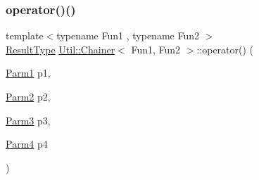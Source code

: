 \mbox{\label{classUtil_1_1Chainer_aebe5bd1cb7c2523124ccdf2b406ff7d1}} 
\subsubsection{\texorpdfstring{operator()()}{operator()()}\hspace{0.1cm}{\footnotesize\ttfamily [14/18]}}
{\footnotesize\ttfamily template$<$typename Fun1 , typename Fun2 $>$ \\
\mbox{\hyperlink{classUtil_1_1Chainer_a2c8d88a77b8ba93eb915dc799ddafbb9}{Result\+Type}} \mbox{\hyperlink{classUtil_1_1Chainer}{Util\+::\+Chainer}}$<$ Fun1, Fun2 $>$\+::operator() (\begin{DoxyParamCaption}\item[{\mbox{\hyperlink{classUtil_1_1Chainer_a3e09b2267dabdd8d12070b09c47749c6}{Parm1}}}]{p1,  }\item[{\mbox{\hyperlink{classUtil_1_1Chainer_a1bfb0e8f35679278c85d232a74a107ff}{Parm2}}}]{p2,  }\item[{\mbox{\hyperlink{classUtil_1_1Chainer_ac28811d7153f7b7cf837f7b8626436c8}{Parm3}}}]{p3,  }\item[{\mbox{\hyperlink{classUtil_1_1Chainer_a82e756f3083e3883a05644425474f789}{Parm4}}}]{p4 }\end{DoxyParamCaption})\hspace{0.3cm}{\ttfamily [inline]}}

\mbox{\label{classUtil_1_1Chainer_aebe5bd1cb7c2523124ccdf2b406ff7d1}} 
